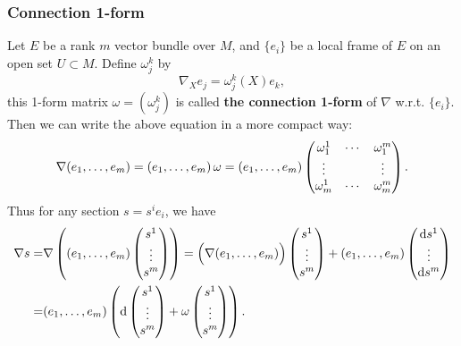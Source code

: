 \subsubsection{Connection 1-form}
Let $E$ be a rank $m$ vector bundle over $M$, and $\{e_i\}$ be a local frame of $E$ on an open set $U\subset M$. 
Define $\omega_j^k$ by
\begin{equation*}
    \nabla_X e_j = \omega_j^k(X) e_k,
\end{equation*}
this 1-form matrix $\omega = (\omega_j^k)$ is called \textbf{the connection 1-form} of $\nabla$ w.r.t. $\{e_i\}$. 
Then we can write the above equation in a more compact way:
\begin{equation*}
    \nabla ({e}_{1},\dots,{e}_{m}) = ({e}_{1},\dots,{e}_{m})\,\omega = 
    ({e}_{1},\dots,{e}_{m})
    \begin{pmatrix}
        \omega_1^1 & \cdots & \omega_1^m \\
        \vdots &  & \vdots \\
        \omega_m^1 & \cdots & \omega_m^m
    \end{pmatrix}.
\end{equation*}
Thus for any section $s = s^i e_i$, we have 
\begin{align*}
    \nabla s =& \nabla\left(({e}_{1},\dots,{e}_{m})
    \begin{pmatrix}
        s^1 \\ \vdots \\ s^m
    \end{pmatrix}
    \right) 
    = \Big(\nabla({e}_{1},\dots,{e}_{m})\Big)
    \begin{pmatrix}
        s^1 \\ \vdots \\ s^m
    \end{pmatrix} + ({e}_{1},\dots,{e}_{m}) 
    \begin{pmatrix}
        {\rm d} s^1 \\ \vdots \\ {\rm d} s^m
    \end{pmatrix} \\
    =& ({e}_{1},\dots,{e}_{m}) 
    \left( {\rm d} 
    \begin{pmatrix}
        s^1 \\ \vdots \\ s^m 
    \end{pmatrix} + 
    \omega 
    \begin{pmatrix}
        s^1 \\ \vdots \\ s^m
    \end{pmatrix}
    \right).
\end{align*}
